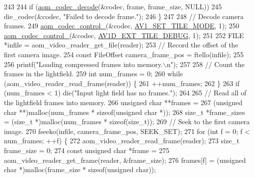 \begin{DoxyCodeInclude}
{{{{{243 
244     \textcolor{keywordflow}{if} (\hyperlink{group__decoder_gab03fdb999d1f83a5896869a3ba5f68f7}{aom\_codec\_decode}(&codec, frame, frame\_size, NULL))
245       die\_codec(&codec, \textcolor{stringliteral}{"Failed to decode frame."});
246   \}
247 
248   \textcolor{comment}{// Decode camera frames.}
249   \hyperlink{group__codec_ga51eb332a40dcacc39000ab8e0be36b79}{aom\_codec\_control\_}(&codec, \hyperlink{group__aom__decoder_gga3865fd4b3192489baa9a5c3632ebe97ba0795d8084ae8c78528c01587198df9e2}{AV1\_SET\_TILE\_MODE}, 1);
250   \hyperlink{group__codec_ga51eb332a40dcacc39000ab8e0be36b79}{aom\_codec\_control\_}(&codec, \hyperlink{group__aom__decoder_gga3865fd4b3192489baa9a5c3632ebe97baffdaca91296725bd16142a33f3cc6522}{AV1D\_EXT\_TILE\_DEBUG}, 1);
251 
252   FILE *infile = aom\_video\_reader\_get\_file(reader);
253   \textcolor{comment}{// Record the offset of the first camera image.}
254   \textcolor{keyword}{const} FileOffset camera\_frame\_pos = ftello(infile);
255 
256   printf(\textcolor{stringliteral}{"Loading compressed frames into memory.\(\backslash\)n"});
257 
258   \textcolor{comment}{// Count the frames in the lightfield.}
259   \textcolor{keywordtype}{int} num\_frames = 0;
260   \textcolor{keywordflow}{while} (aom\_video\_reader\_read\_frame(reader)) \{
261     ++num\_frames;
262   \}
263   \textcolor{keywordflow}{if} (num\_frames < 1) die(\textcolor{stringliteral}{"Input light field has no frames."});
264 
265   \textcolor{comment}{// Read all of the lightfield frames into memory.}
266   \textcolor{keywordtype}{unsigned} \textcolor{keywordtype}{char} **frames =
267       (\textcolor{keywordtype}{unsigned} \textcolor{keywordtype}{char} **)malloc(num\_frames * \textcolor{keyword}{sizeof}(\textcolor{keywordtype}{unsigned} \textcolor{keywordtype}{char} *));
268   \textcolor{keywordtype}{size\_t} *frame\_sizes = (\textcolor{keywordtype}{size\_t} *)malloc(num\_frames * \textcolor{keyword}{sizeof}(\textcolor{keywordtype}{size\_t}));
269   \textcolor{comment}{// Seek to the first camera image.}
270   fseeko(infile, camera\_frame\_pos, SEEK\_SET);
271   \textcolor{keywordflow}{for} (\textcolor{keywordtype}{int} f = 0; f < num\_frames; ++f) \{
272     aom\_video\_reader\_read\_frame(reader);
273     \textcolor{keywordtype}{size\_t} frame\_size = 0;
274     \textcolor{keyword}{const} \textcolor{keywordtype}{unsigned} \textcolor{keywordtype}{char} *frame =
275         aom\_video\_reader\_get\_frame(reader, &frame\_size);
276     frames[f] = (\textcolor{keywordtype}{unsigned} \textcolor{keywordtype}{char} *)malloc(frame\_size * \textcolor{keyword}{sizeof}(\textcolor{keywordtype}{unsigned} \textcolor{keywordtype}{char}));
}}}}}
\end{DoxyCodeInclude}
